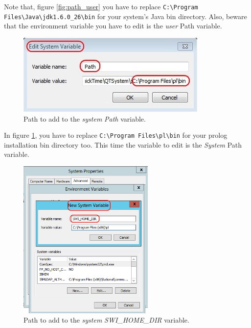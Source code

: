 Note that, figure \ref{fig:path_user} you have to replace \verb=C:\Program Files\Java\jdk1.6.0_26\bin=
for your system's Java bin directory. Also, beware that the environment
variable you have to edit is the \emph{user} Path variable.

\begin{figure}[h]
\begin{center}
  \includegraphics[scale=0.9]{imgs/path_system.jpg}
  \caption{Path to add to the \emph{system} \emph{Path} variable.}
  \label{fig:path_system}
\end{center}
\end{figure}

In figure \ref{fig:path_system}, you have to replace \verb=C:\Program Files\pl\bin= for your prolog installation
bin directory too. This time the variable to edit is the \emph{System} Path
variable.

\begin{figure}[h]
\begin{center}
  \includegraphics[width=0.6\textwidth]{imgs/swi_prolog_path.png}
  \caption{Path to add to the \emph{system} \emph{SWI\_HOME\_DIR} variable.}
  \label{fig:swi_pl_path}
\end{center}
\end{figure}

